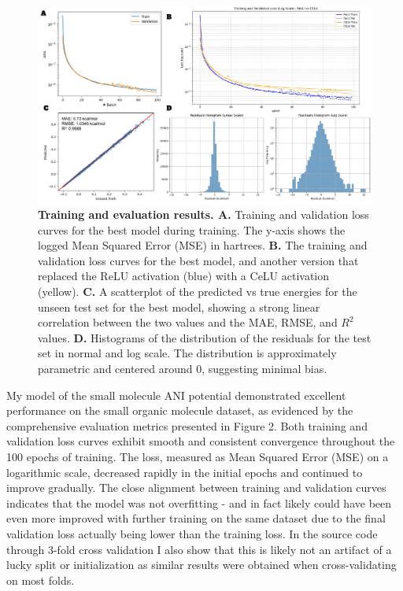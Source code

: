 \documentclass[11pt, twocolumn]{article}
\begin{document}
\begin{figure}[t]
  \centering
  \includegraphics[width=\textwidth]{figures/bioe142-fig2.pdf}
  \caption{\textbf{Training and evaluation results. A.} Training and validation loss curves for the best model during training. The y-axis shows the logged Mean Squared Error (MSE) in hartrees. \textbf{B.} The training and validation loss curves for the best model, and another version that replaced the ReLU activation (blue) with a CeLU activation (yellow). \textbf{C.} A scatterplot of the predicted vs true energies for the unseen test set for the best model, showing a strong linear correlation between the two values and the MAE, RMSE, and $R^2$ values. \textbf{D.} Histograms of the distribution of the residuals for the test set in normal and log scale. The distribution is approximately parametric and centered around 0, suggesting minimal bias.}
  \label{fig:results}
\end{figure}

My model of the small molecule ANI potential demonstrated excellent performance on the small organic molecule dataset, as evidenced by the comprehensive evaluation metrics presented in Figure 2. Both training and validation loss curves exhibit smooth and consistent convergence throughout the 100 epochs of training. The loss, measured as Mean Squared Error (MSE) on a logarithmic scale, decreased rapidly in the initial epochs and continued to improve gradually. The close alignment between training and validation curves indicates that the model was not overfitting - and in fact likely could have been even more improved with further training on the same dataset due to the final validation loss actually being lower than the training loss. In the source code through 3-fold cross validation I also show that this is likely not an artifact of a lucky split or initialization as similar results were obtained when cross-validating on most folds.
\end{document}
